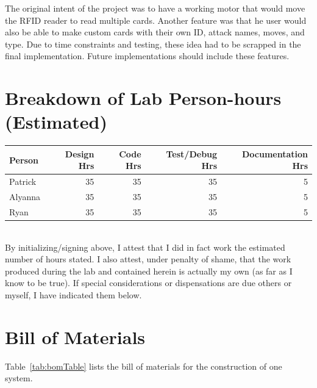 \documentclass[12pt]{article} %
\begin{document}
The original intent of the project was to have a working motor that would move the RFID reader to read multiple cards. Another feature was that he user would also be able to make custom cards with their own ID, attack names, moves, and type. Due to time constraints and testing, these idea had to be scrapped in the final implementation. Future implementations should include these features.

\pagebreak
\appendix


\section{Breakdown of Lab Person-hours (Estimated)}
\begin{tabular}{|l|*{4}{r|}}
	\hline
	Person & Design Hrs & Code Hrs & Test/Debug Hrs & Documentation Hrs \\ \hline
	Patrick & 35 & 35 & 35 & 5  \\ \hline
	Alyanna & 35 & 35 & 35 & 5 \\ \hline
	Ryan & 35 & 35 & 35 & 5  \\ \hline
\end{tabular}

~\\

By initializing/signing above, I attest that I did in fact work the
estimated number of hours stated. I also attest, under penalty of shame,
that the work produced during the lab and contained herein is actually my
own (as far as I know to be true). If special considerations or
dispensations are due others or myself, I have indicated them below.

\pagebreak

\section{Bill of Materials\label{appendix:bom}}
Table~\ref{tab:bomTable} lists the bill of materials for the construction of
one system.
\end{document}
